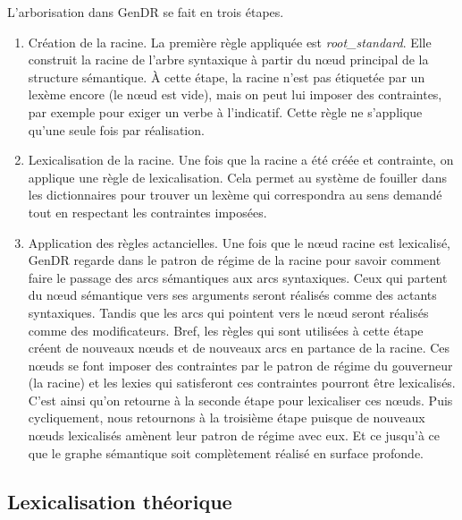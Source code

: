 L'arborisation dans GenDR se fait en trois étapes.

\begin{enumerate}
  \item Création de la racine.
  La première règle appliquée est \emph{root\_standard}. Elle construit la racine de l'arbre syntaxique à partir du n\oe{}ud principal de la structure sémantique. À cette étape, la racine n'est pas étiquetée par un lexème encore (le n\oe{}ud est vide), mais on peut lui imposer des contraintes, par exemple pour exiger un verbe à l'indicatif. Cette règle ne s'applique qu'une seule fois par réalisation.

  \item Lexicalisation de la racine.
  Une fois que la racine a été créée et contrainte, on applique une règle de lexicalisation. Cela permet au système de fouiller dans les dictionnaires pour trouver un lexème qui correspondra au sens demandé tout en respectant les contraintes imposées.

  \item Application des règles actancielles.
  Une fois que le n\oe{}ud racine est lexicalisé, GenDR regarde dans le patron de régime de la racine pour savoir comment faire le passage des arcs sémantiques aux arcs syntaxiques. Ceux qui partent du n\oe{}ud sémantique vers ses arguments seront réalisés comme des actants syntaxiques. Tandis que les arcs qui pointent vers le n\oe{}ud seront réalisés comme des modificateurs. Bref, les règles qui sont utilisées à cette étape créent de nouveaux n\oe{}uds et de nouveaux arcs en partance de la racine. Ces n\oe{}uds se font imposer des contraintes par le patron de régime du gouverneur (la racine) et les lexies qui satisferont ces contraintes pourront être lexicalisés. C'est ainsi qu'on retourne à la seconde étape pour lexicaliser ces n\oe{}uds. Puis cycliquement, nous retournons à la troisième étape puisque de nouveaux n\oe{}uds lexicalisés amènent leur patron de régime avec eux. Et ce jusqu'à ce que le graphe sémantique soit complètement réalisé en surface profonde.
\end{enumerate}

\subsection{Lexicalisation théorique}

